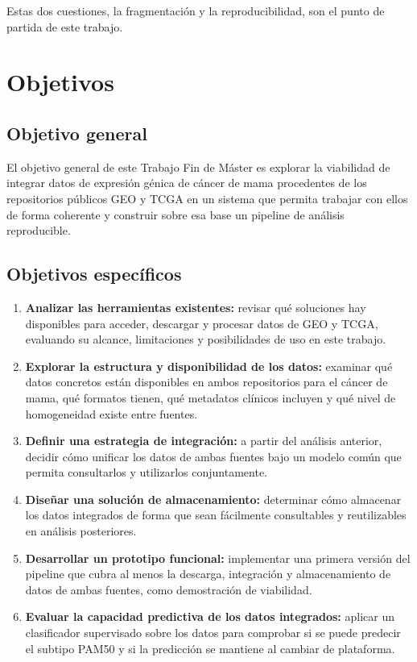 \documentclass[12pt, a4paper]{report}
\begin{document}
Estas dos cuestiones, la fragmentación y la reproducibilidad, son el punto de partida de este trabajo.


\chapter{Objetivos}

\section{Objetivo general}

El objetivo general de este Trabajo Fin de Máster es explorar la viabilidad de integrar datos de expresión génica de cáncer de mama procedentes de los repositorios públicos GEO y TCGA en un sistema que permita trabajar con ellos de forma coherente y construir sobre esa base un pipeline de análisis reproducible.

\section{Objetivos específicos}

\begin{enumerate}
  \item \textbf{Analizar las herramientas existentes:} revisar qué soluciones hay disponibles para acceder, descargar y procesar datos de GEO y TCGA, evaluando su alcance, limitaciones y posibilidades de uso en este trabajo.
  \item \textbf{Explorar la estructura y disponibilidad de los datos:} examinar qué datos concretos están disponibles en ambos repositorios para el cáncer de mama, qué formatos tienen, qué metadatos clínicos incluyen y qué nivel de homogeneidad existe entre fuentes.
  \item \textbf{Definir una estrategia de integración:} a partir del análisis anterior, decidir cómo unificar los datos de ambas fuentes bajo un modelo común que permita consultarlos y utilizarlos conjuntamente.
  \item \textbf{Diseñar una solución de almacenamiento:} determinar cómo almacenar los datos integrados de forma que sean fácilmente consultables y reutilizables en análisis posteriores.
  \item \textbf{Desarrollar un prototipo funcional:} implementar una primera versión del pipeline que cubra al menos la descarga, integración y almacenamiento de datos de ambas fuentes, como demostración de viabilidad.
  \item \textbf{Evaluar la capacidad predictiva de los datos integrados:} aplicar un clasificador supervisado sobre los datos para comprobar si se puede predecir el subtipo PAM50 y si la predicción se mantiene al cambiar de plataforma.
\end{enumerate}
\end{document}
